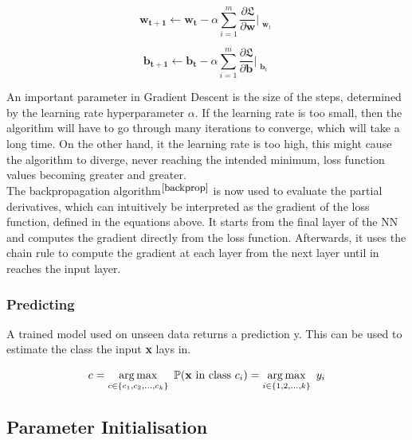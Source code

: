 \begin{equation}
  \mathbf{w_{t+1}} \leftarrow \mathbf{w_t} - \alpha \sum_{i=1}^m \frac{\partial \mathfrak{L}}{\partial \mathbf{w}}\Bigr|_{\substack{\mathbf{w}_t}}
\end{equation}

\begin{equation}
  \mathbf{b_{t+1}} \leftarrow \mathbf{b_t} - \alpha \sum_{i=1}^m \frac{\partial \mathfrak{L}}{\partial \mathbf{b}}\Bigr|_{\substack{\mathbf{b}_t}}
\end{equation}

\bigskip

An important parameter in Gradient Descent is the size of the steps, determined by the learning rate hyperparameter $\alpha$. If the learning rate is too small, then the algorithm will have to go through many iterations to converge, which will take a long time. On the other hand, it the learning rate is too high, this might cause the algorithm to diverge, never reaching the intended minimum, loss function values becoming greater and greater. \\



The backpropagation algorithm$^{\small \cite{backprop}}$ is now used to evaluate the partial derivatives, which can intuitively be interpreted as the gradient of the loss function, defined in the equations above. It starts from the final layer of the NN and computes the gradient directly from the loss function. Afterwards, it uses the chain rule to compute the gradient at each layer from the next layer until in reaches the input layer. 



\subsubsection*{Predicting}

A trained model used on unseen data returns a prediction y. This can be used to estimate the class the input \textbf{x} lays in.

\begin{equation}
  c = \operatorname*{arg\,max}_{c \in \{ c_1, c_2, ..., c_k\}} \ \mathbb{P}(\mathbf{x} \ \text{in class} \ c_i) = \operatorname*{arg\,max}_{i \in \{ 1, 2, ..., k\}} \ y_i
\end{equation}


 \subsection{Parameter Initialisation}

